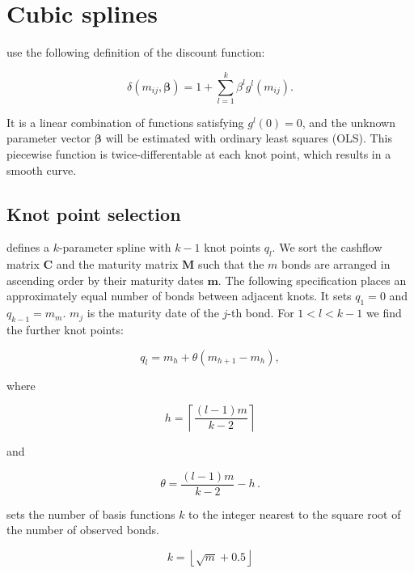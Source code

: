 \newpage
\section{Cubic splines}
\label{sec:cubic-splines}

\cite{McCulloch1971, McCulloch1975} use the following definition of the discount function:

\begin{equation}
  \label{eq:df_spline}
  \delta(m_{ij},\bm{\beta})=1+\sum_{l=1}^k\beta^lg^l(m_{ij}).
\end{equation}

It is a linear combination of functions satisfying $g^l(0)=0$, and the unknown parameter vector $\bm{\beta}$ will be estimated with ordinary least squares (OLS). This piecewise function is twice-differentable at each knot point, which results in a smooth curve.

\subsection{Knot point selection}

\cite{McCulloch1975} defines a $k$-parameter spline with $k-1$ knot points $q_l$. We sort the cashflow matrix $\bm{C}$ and the maturity matrix $\bm{M}$ such that the $m$ bonds are arranged in ascending order by their maturity dates $\bm{m}$. The following specification places an approximately equal number of bonds between adjacent knots. It sets $q_1=0$ and $q_{k-1}=m_m$. $m_j$ is the maturity date of the $j$-th bond. For $1<l<k-1$ we find the further knot points:

\begin{equation*}
  \label{eq:A.1a}
  q_l = m_h+\theta(m_{h+1}-m_h),
\end{equation*}

where

\begin{equation*}
 \label{eq:A.1b}
  h = \left\lceil\frac{(l-1)m}{k-2}\right\rceil
\end{equation*}

and

\begin{equation*}
  \label{eq:A.1c}
  \theta = \frac{(l-1)m}{k-2}-h\,.
\end{equation*}

\cite{McCulloch1971} sets the  number of basis functions $k$ to the integer nearest to the square root of the number of observed bonds. 

\begin{equation*}
  \label{eq:nofknots}
  k = \left\lfloor\sqrt{m}+0.5\right\rfloor
\end{equation*}


